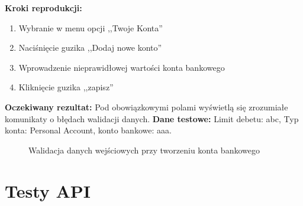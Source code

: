 \begin{enumerate}[labelwidth=1em,label=\Roman*]
    \textbf{Kroki reprodukcji:}  \begin{enumerate}[label=\arabic*.]
        \item Wybranie w menu opcji ,,Twoje Konta''
        \item Naciśnięcie guzika ,,Dodaj nowe konto''
        \item Wprowadzenie nieprawidłowej wartości konta bankowego
        \item Kliknięcie guzika ,,zapisz''
    \end{enumerate}
    \textbf{Oczekiwany rezultat:}  Pod obowiązkowymi polami wyświetlą się zrozumiałe komunikaty o błędach walidacji danych. \newline
    \textbf{Dane testowe:} Limit debetu: abc, Typ konta: Personal Account, konto bankowe: aaa. 
\end{enumerate}

\begin{figure}[b]
	\centering
	\caption{Walidacja danych wejściowych przy tworzeniu konta bankowego}
	\label{fig:client-test-1}
\end{figure}

\section{Testy API}
\label{sec:test-api}

